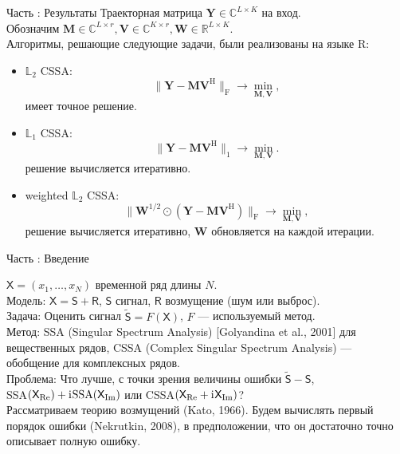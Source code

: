 \documentclass[10pt, ucs, notheorems, handout]{beamer}
\newcommand{\tX}[1]{\mathsf{#1}}
\newcommand{\iu}{\mathrm{i}\mkern1mu}
\newcommand{\RomanNumeralCaps}[1]
{\MakeUppercase{\romannumeral #1}}
\begin{document}
\begin{frame}{Часть \RomanNumeralCaps{1}: Результаты}
	Траекторная матрица $\mathbf{Y} \in \mathbb{C}^{L\times K}$ на вход.\\ 
	Обозначим $\mathbf{M} \in \mathbb{C}^{L\times r}, \mathbf{V} \in \mathbb{C}^{K\times r}, \mathbf{W} \in \mathbb{R}^{L\times K}$.\\
	\vspace{1em}
	Алгоритмы, решающие следующие задачи, были реализованы на языке R:
	\begin{itemize}
		\item $\mathbb{L}_2$ CSSA: 
		$$ \|\mathbf{Y}-\mathbf{M}\mathbf{V}^{\mathrm{H}}\|_\mathrm{F} \longrightarrow \min_{\mathbf{M},\mathbf{V}},$$
		имеет точное решение.
		\item $\mathbb{L}_1$ CSSA:
		$$\|\mathbf{Y}-\mathbf{M}\mathbf{V}^{\mathrm{H}}\|_1 \longrightarrow \min_{\mathbf{M},\mathbf{V}}.$$
		решение вычисляется итеративно.
		\item weighted $\mathbb{L}_2$ CSSA:
		$$\|\mathbf{W}^{1/2}\odot(\mathbf{Y}-\mathbf{M}\mathbf{V}^{\mathrm{H}})\|_\mathrm{F} \longrightarrow \min_{\mathbf{M},\mathbf{V}},$$
		решение вычисляется итеративно, $\mathbf{W}$ обновляется на каждой итерации. 
	\end{itemize}

\end{frame}

\begin{frame}{Часть \RomanNumeralCaps{2}: Введение}
	
	$\tX{X} = (x_1, \ldots, x_{N})$ временной ряд длины $N$.\\
	\vspace{1em}
	\alert{Модель:} $\tX{X} = \tX{S} + \tX{R}$, $\tX{S}$ сигнал, $\tX{R}$ возмущение (шум или выброс).\\
	\vspace{1em}
	\alert{Задача:} Оценить сигнал $\tilde{\tX{S}} = F(\tX{X})$, $F$ --- используемый метод.\\
	\vspace{1em}
	\alert{Метод:} SSA (Singular Spectrum Analysis) [Golyandina et al., 2001] для вещественных рядов, CSSA (Complex Singular Spectrum Analysis) --- обобщение для комплексных рядов.\\
	\vspace{1em}
	\alert{Проблема:} Что лучше, с точки зрения величины ошибки $\tilde{\tX{S}} - \tX{S}$,\\
	SSA$(\tX{X}_{\Re}) + \iu \text{SSA}(\tX{X}_{\Im})$ или CSSA$(\tX{X}_{\Re} + \iu \tX{X}_{\Im})$?\\
	\vspace{1em}
	Рассматриваем теорию возмущений (Kato, 1966). Будем вычислять первый порядок ошибки (Nekrutkin, 2008), в предположении, что он достаточно точно описывает полную ошибку.
\end{frame}
\end{document}
